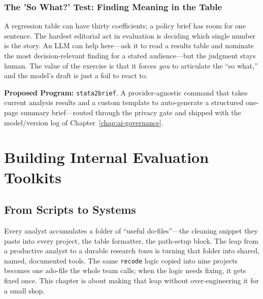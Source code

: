 \documentclass[
    a4paper,
    fontsize=10pt,
    twoside=true,
    numbers=noenddot,
]{kaobook}
\begin{document}
\subsection{The 'So What?' Test: Finding Meaning in the Table}
A regression table can have thirty coefficients; a policy brief has room for one sentence. The hardest editorial act in evaluation is deciding which single number is the story. An LLM can help here---ask it to read a results table and nominate the most decision-relevant finding for a stated audience---but the judgment stays human. The value of the exercise is that it forces \emph{you} to articulate the \enquote{so what,} and the model's draft is just a foil to react to.

\begin{kaobox}[frametitle=Ado-file Idea: \texttt{stata2brief}]
\textbf{Proposed Program:} \texttt{stata2brief}. A provider-agnostic command that takes current analysis results and a custom template to auto-generate a structured one-page summary brief---routed through the privacy gate and shipped with the model/version log of Chapter~\ref{chap:ai-governance}.
\end{kaobox}



\chapter{Building Internal Evaluation Toolkits}
\section{From Scripts to Systems}
Every analyst accumulates a folder of \enquote{useful do-files}---the cleaning snippet they paste into every project, the table formatter, the path-setup block. The leap from a productive analyst to a durable research \emph{team} is turning that folder into shared, named, documented tools. The same \texttt{recode} logic copied into nine projects becomes one ado-file the whole team calls; when the logic needs fixing, it gets fixed once. This chapter is about making that leap without over-engineering it for a small shop.
\end{document}
